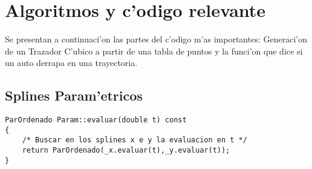 \section{Algoritmos y c'odigo relevante}
\label{codigo}
Se presentan a continuaci'on las partes del c'odigo m'as importantes: 
Generaci'on de un Trazador C'ubico a partir de una tabla de puntos y la 
funci'on que dice si un auto derrapa en una trayectoria.

\lstset{
	basicstyle=\small,
	showstringspaces=false,
 	language=c,
	keywordstyle=\bfseries,
	stringstyle=\ttfamily,
	tabsize=4
	}

\subsection{Splines Param'etricos}
\begin{lstlisting}
ParOrdenado Param::evaluar(double t) const
{
	/* Buscar en los splines x e y la evaluacion en t */
	return ParOrdenado(_x.evaluar(t),_y.evaluar(t));
}

\end{lstlisting}


\newpage

